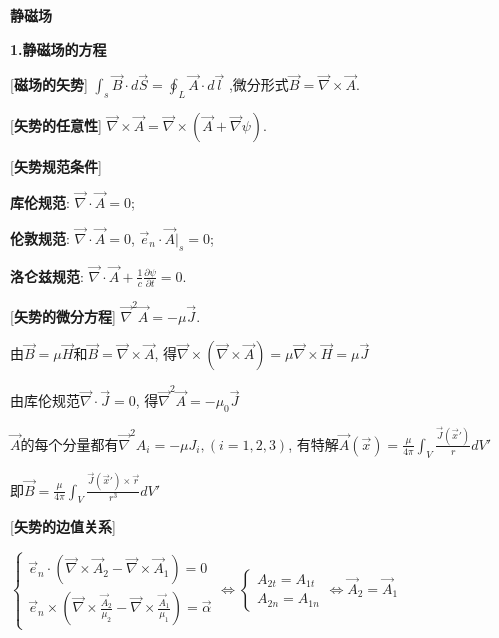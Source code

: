 


 \begin{center} 
 \Large \textbf{静磁场}
\end{center}
 
\large 
\begin{center}
 \textbf{1.静磁场的方程}
\end{center}

[\textbf{磁场的矢势}] $\int_s\vec B\cdot d\vec S=\oint_L\vec A\cdot d\vec l$ ,微分形式$\vec B=\vec \nabla\times\vec A$.\par

[\textbf{矢势的任意性}] $\vec\nabla\times\vec A=\vec\nabla\times (\vec A+\vec\nabla\psi)$.\par

[\textbf{矢势规范条件}] \par
\qquad \textbf{库伦规范}: $\vec\nabla\cdot\vec A=0$;\par
\qquad \textbf{伦敦规范}: $\vec\nabla\cdot\vec A=0$, $\vec e_n\cdot\vec A|_s=0$;\par
\qquad \textbf{洛仑兹规范}: $\vec\nabla\cdot\vec A+\frac{1}{c}\frac{\partial\psi}{\partial t}=0$.\par

[\textbf{矢势的微分方程}] $\vec\nabla^2\vec A=-\mu\vec J$.\par
\qquad 由$\vec B=\mu\vec H$和$\vec B=\vec\nabla\times\vec A$, 得$\vec\nabla\times(\vec\nabla\times\vec A)=\mu\vec\nabla\times\vec H=\mu\vec J$\par
\qquad 由库伦规范$\vec\nabla\cdot\vec J=0$, 得$\vec\nabla^2\vec A=-\mu_0\vec J$\par
\qquad $\vec A$的每个分量都有$\vec\nabla^2 A_i=-\mu J_i, (i=1,2,3)$, 有特解$\vec A(\vec x)=\frac{\mu}{4\pi}\int_V\frac{\vec J(\vec x')}{r}dV'$\par
\qquad \quad 即$\vec B=\frac{\mu}{4\pi}\int_V\frac{\vec J(\vec x')\times\vec r}{r^3}dV'$\par

[\textbf{矢势的边值关系}]\par
\qquad $\begin{cases}\vec e_n\cdot(\vec\nabla\times\vec A_2-\vec\nabla\times\vec A_1)=0\\ \vec e_n\times(\vec\nabla\times\frac{\vec A_2}{\mu_2}-\vec\nabla\times\frac{\vec A_1}{\mu_1})=\vec\alpha \end{cases} \Leftrightarrow \begin{cases}A_{2t}=A_{1t}\\A_{2n}=A_{1n}\end{cases}\Leftrightarrow \vec A_2=\vec A_1$\par

